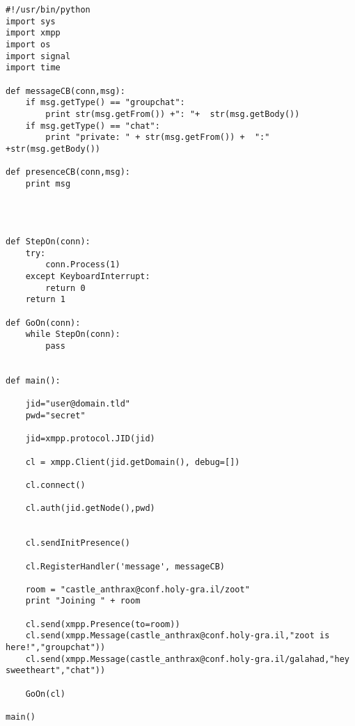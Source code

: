 \begin{verbatim}
#!/usr/bin/python
import sys
import xmpp
import os
import signal
import time

def messageCB(conn,msg):
	if msg.getType() == "groupchat":
		print str(msg.getFrom()) +": "+  str(msg.getBody())
	if msg.getType() == "chat":
		print "private: " + str(msg.getFrom()) +  ":" +str(msg.getBody())

def presenceCB(conn,msg):
	print msg




def StepOn(conn):
    try:
        conn.Process(1)
    except KeyboardInterrupt:
	    return 0
    return 1

def GoOn(conn):
    while StepOn(conn):
	    pass


def main():

	jid="user@domain.tld"
	pwd="secret"

	jid=xmpp.protocol.JID(jid)

	cl = xmpp.Client(jid.getDomain(), debug=[])

	cl.connect()

	cl.auth(jid.getNode(),pwd)


	cl.sendInitPresence()

	cl.RegisterHandler('message', messageCB)

	room = "castle_anthrax@conf.holy-gra.il/zoot"
	print "Joining " + room

	cl.send(xmpp.Presence(to=room))
	cl.send(xmpp.Message(castle_anthrax@conf.holy-gra.il,"zoot is here!","groupchat"))
	cl.send(xmpp.Message(castle_anthrax@conf.holy-gra.il/galahad,"hey sweetheart","chat"))

	GoOn(cl)

main()
\end{verbatim}